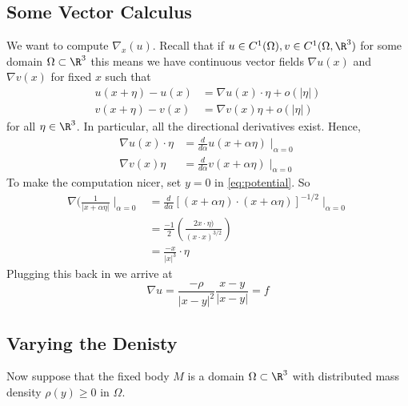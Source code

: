 \documentclass{bkcnotes}
\begin{document}
\subsection{Some Vector Calculus}
We want to compute $\nabla_x(u)$. Recall that if $u \in C^1(\Omega), v
\in C^1(\Omega, \R^3)$ for some domain $\Omega \subset \R^3$ this means
we have continuous vector fields $\nabla u(x)$ and $\nabla v(x)$ for
fixed $x$ such that
\begin{equation}
  \label{eq:grad-def}
  \begin{aligned}
    u(x+\eta) - u(x) &= \nabla u(x)\cdot \eta + o(|\eta |) \\
    v(x+\eta) - v(x) &= \nabla v(x) \eta + o(|\eta |)
  \end{aligned}
\end{equation}
for all $\eta \in \R^3$. In particular, all the directional
derivatives exist. Hence,
\begin{equation}
  \label{eq:directional-ders}
  \begin{aligned}
    \nabla u(x)\cdot \eta &= \frac{d}{d\alpha} u(x+\alpha \eta) \mid_{\alpha=0} \\
    \nabla v(x)\eta &= \frac{d}{d\alpha} v(x+\alpha \eta) \mid_{\alpha=0}
  \end{aligned}
\end{equation}
To make the computation nicer, set $y = 0$ in
\eqref{eq:potential}. So
\begin{equation}
  \label{eq:potential-gradient}
  \begin{aligned}
    \nabla(\frac{1}{|x+\alpha\eta |}\mid_{\alpha=0} &=
    \frac{d}{d\alpha}\left[(x+\alpha\eta)\cdot (x+\alpha\eta)\right]^{-1/2} \mid_{\alpha =0} \\
    &= \frac{-1}{2}\left(\frac{2x\cdot \eta)}{(x\cdot x)^{3/2}}\right) \\
    &= \frac{-x}{|x|^3}\cdot \eta    
  \end{aligned}
\end{equation}
Plugging this back in we arrive at
\begin{equation}
  \label{eq:grad-u}
  \nabla u = \frac{-\rho}{|x-y|^2}\frac{x-y}{|x-y|} = f
\end{equation}

\subsection{Varying the Denisty}
Now suppose that the fixed body $M$ is a domain $\Omega \subset \R^3$
with distributed mass density $\rho(y) \geq 0$ in $\Omega$.
\end{document}
